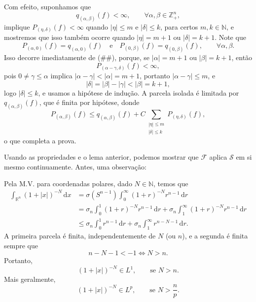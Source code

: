\documentclass[../distribution_theory_notes.tex]{subfiles}
\begin{document}
\begin{proof*}
	Com efeito, suponhamos que
	\[
		q_{(\alpha ,\beta )}(f)<\infty ,\qquad \forall \alpha ,\beta \in \mathbb{Z}_{+}^{n},
	\]
	implique \(P_{(\eta ,\delta )}(f)<\infty \) quando \(|\eta |\leq m\) e \(|\delta |\leq k\), para certos \(m,k\in \mathbb{N}\), e mostremos que isso também ocorre quando \(|\eta |=m+1\) ou \(|\delta |=k+1\). Note que
	\[
		P_{(\alpha ,0)}(f)=q_{(\alpha ,0)}(f)\quad \text{e}\quad P_{(0,\beta )}(f)=q_{(0,\beta )}(f),\qquad \forall \alpha ,\beta .
	\]
	Isso decorre imediatamente de (\#\#), porque, se \(|\alpha |=m+1\) ou \(|\beta |=k+1\), então
	\[
		P_{(\alpha -\gamma ,\delta )}(f)<\infty ,
	\]
	pois \(0\neq \gamma \leq \alpha \) implica \(|\alpha -\gamma |<|\alpha |=m+1\), portanto \(|\alpha -\gamma |\leq m\), e
	\[
		|\delta |=|\beta |-|\gamma |<|\beta |=k+1,
	\]
	logo \(|\delta |\leq k\), e usamos a hipótese de indução. A parcela isolada é limitada por \(q_{(\alpha ,\beta )}(f)\), que é finita por hipótese, donde
	\[
		P_{(\alpha ,\beta )}(f)
		\leq q_{(\alpha ,\beta )}(f)
		+C\sum_{\substack{|\eta |\leq m\\|\delta |\leq k}}P_{(\eta ,\delta )}(f),
	\]
	o que completa a prova. \qedsymbol
\end{proof*}

Usando as propriedades e o lema anterior, podemos mostrar que \(\mathcal{F}\) aplica \(\mathcal{S}\) em si mesmo continuamente. Antes, uma observação:

\begin{tcolorbox}[
		skin=enhanced,
		title=Observação,
		fonttitle=\bfseries,
		colframe=black,
		colbacktitle=cyan!75!white,
		colback=cyan!15,
		colbacklower=black,
		coltitle=black,
		drop fuzzy shadow
	]
	Pela M.V. para coordenadas polares, dado \(N\in \mathbb{N}\), temos que
	\begin{align*}
		\int_{\mathbb{R}^{n}}(1+|x|)^{-N}\,\mathrm{d}x
		 & =\sigma (S^{n-1})\int_{0}^{\infty }(1+r)^{-N}r^{n-1}\,\mathrm{d}r \\
		 & =\sigma _{n}\int_{0}^{1}(1+r)^{-N}r^{n-1}\,\mathrm{d}r
		+\sigma _{n}\int_{1}^{\infty }(1+r)^{-N}r^{n-1}\,\mathrm{d}r         \\
		 & \leq \sigma _{n}\int_{0}^{1}r^{n-1}\,\mathrm{d}r
		+\sigma _{n}\int_{1}^{\infty }r^{n-N-1}\,\mathrm{d}r.
	\end{align*}
	A primeira parcela é finita, independentemente de \(N\) (ou \(n\)), e a segunda é finita sempre que
	\[
		n-N-1<-1\Longleftrightarrow N>n.
	\]
	Portanto,
	\[
		(1+|x|)^{-N}\in L^{1},\qquad \text{se }N>n.
	\]
	Mais geralmente,
	\[
		(1+|x|)^{-N}\in L^{p},\qquad \text{se }N>\frac{n}{p}.
	\]
\end{tcolorbox}
\end{document}
